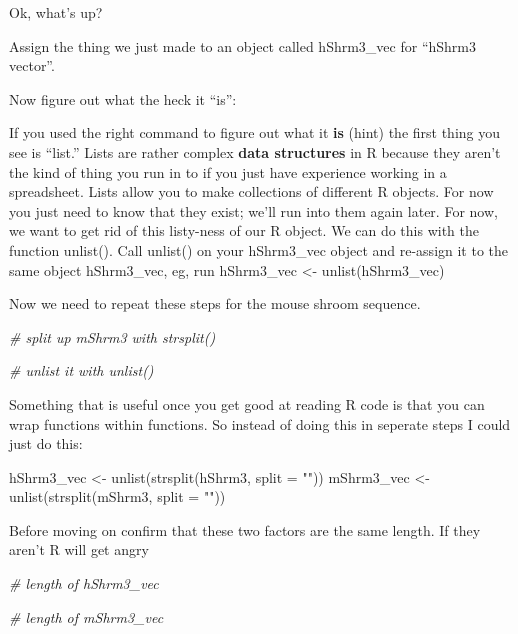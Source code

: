 \documentclass[
]{book}
\newenvironment{Shaded}{\begin{snugshade}}{\end{snugshade}}
\newcommand{\AttributeTok}[1]{\textcolor[rgb]{0.77,0.63,0.00}{#1}}
\newcommand{\CommentTok}[1]{\textcolor[rgb]{0.56,0.35,0.01}{\textit{#1}}}
\newcommand{\FunctionTok}[1]{\textcolor[rgb]{0.00,0.00,0.00}{#1}}
\newcommand{\NormalTok}[1]{#1}
\newcommand{\OtherTok}[1]{\textcolor[rgb]{0.56,0.35,0.01}{#1}}
\newcommand{\StringTok}[1]{\textcolor[rgb]{0.31,0.60,0.02}{#1}}
\begin{document}
Ok, what's up?

Assign the thing we just made to an object called hShrm3\_vec for ``hShrm3 vector''.

Now figure out what the heck it ``is'':

If you used the right command to figure out what it \textbf{is} (hint) the first thing you see is ``list.'' Lists are rather complex \textbf{data structures} in R because they aren't the kind of thing you run in to if you just have experience working in a spreadsheet. Lists allow you to make collections of different R objects. For now you just need to know that they exist; we'll run into them again later. For now, we want to get rid of this listy-ness of our R object. We can do this with the function unlist(). Call unlist() on your hShrm3\_vec object and re-assign it to the same object hShrm3\_vec, eg, run
hShrm3\_vec \textless- unlist(hShrm3\_vec)

Now we need to repeat these steps for the mouse shroom sequence.

\begin{Shaded}
\begin{Highlighting}[]
\CommentTok{\# split up mShrm3 with strsplit()}


\CommentTok{\# unlist it with unlist()}
\end{Highlighting}
\end{Shaded}

Something that is useful once you get good at reading R code is that you can wrap functions within functions. So instead of doing this in seperate steps I could just do this:

\begin{Shaded}
\begin{Highlighting}[]
\NormalTok{hShrm3\_vec }\OtherTok{\textless{}{-}} \FunctionTok{unlist}\NormalTok{(}\FunctionTok{strsplit}\NormalTok{(hShrm3, }\AttributeTok{split =} \StringTok{""}\NormalTok{))}
\NormalTok{mShrm3\_vec }\OtherTok{\textless{}{-}} \FunctionTok{unlist}\NormalTok{(}\FunctionTok{strsplit}\NormalTok{(mShrm3, }\AttributeTok{split =} \StringTok{""}\NormalTok{))}
\end{Highlighting}
\end{Shaded}

Before moving on confirm that these two factors are the same length. If they aren't R will get angry

\begin{Shaded}
\begin{Highlighting}[]
\CommentTok{\# length of hShrm3\_vec}

\CommentTok{\# length of mShrm3\_vec}
\end{Highlighting}
\end{Shaded}
\end{document}
